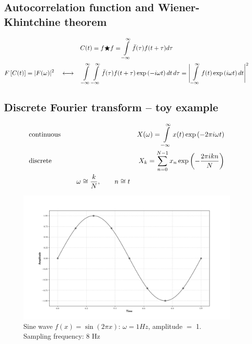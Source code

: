 \documentclass[14pt]{article}
\newcommand{\lb}{\left(}
\newcommand{\rb}{\right)}
\newcommand{\intty}{\int\limits_{-\infty}^{\infty}}
\begin{document}
\subsection*{Autocorrelation function and Wiener-Khintchine theorem}

\begin{gather}
C(t) = f \bigstar f = \intty \bar{f}(\tau) f(t + \tau) d \tau \notag \\
F \left[ C(t) \right] = | F (\omega) |^2 \quad \longleftrightarrow \quad \intty \intty \bar{f}(\tau) f(t + \tau) \exp \lb - i \omega t \rb d t \, d \tau = \Bigg{|} \intty f(t) \exp \lb i \omega t \rb dt \Bigg{|}^2 \notag
\end{gather}

\newpage

\subsection*{Discrete Fourier transform -- toy example}

\begin{gather}
	\begin{aligned}
		& \textup{continuous} \quad \quad \quad &X(\omega) = \intty x(t) \exp \left( - 2 \pi i \omega t \right) \notag \\
	 & \textup{discrete} \quad \quad \quad & X_k = \sum_{n = 0}^{N - 1} x_n \exp \left( - \frac{2 \pi i k n}{N} \right) \notag \\
	& \quad \quad \quad \quad \quad \quad \quad  \omega \cong \frac{k}{N}, \quad \quad n \cong t
\end{aligned}
\end{gather}

\begin{figure}[!h]
\begin{center}
\includegraphics[width=\linewidth]{pictures/signal.png}
\end{center}
\caption{Sine wave $f(x) = \sin \lb 2 \pi x \rb$: $\omega = 1 Hz$, amplitude $ = $ 1. Sampling frequency: 8 Hz}
\end{figure}
\end{document}
